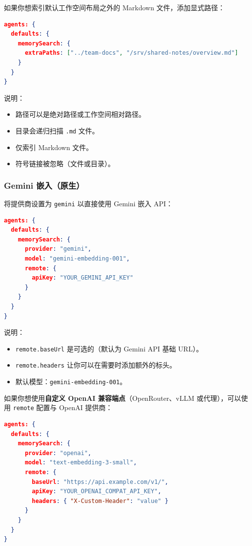 如果你想索引默认工作空间布局之外的 Markdown 文件，添加显式路径：

\begin{lstlisting}[language=json]
agents: {
  defaults: {
    memorySearch: {
      extraPaths: ["../team-docs", "/srv/shared-notes/overview.md"]
    }
  }
}
\end{lstlisting}


说明：

\begin{itemize}
  \item 路径可以是绝对路径或工作空间相对路径。
  \item 目录会递归扫描 \texttt{.md} 文件。
  \item 仅索引 Markdown 文件。
  \item 符号链接被忽略（文件或目录）。
\end{itemize}


\subsubsection{Gemini 嵌入（原生）}


将提供商设置为 \texttt{gemini} 以直接使用 Gemini 嵌入 API：

\begin{lstlisting}[language=json]
agents: {
  defaults: {
    memorySearch: {
      provider: "gemini",
      model: "gemini-embedding-001",
      remote: {
        apiKey: "YOUR_GEMINI_API_KEY"
      }
    }
  }
}
\end{lstlisting}


说明：

\begin{itemize}
  \item \texttt{remote.baseUrl} 是可选的（默认为 Gemini API 基础 URL）。
  \item \texttt{remote.headers} 让你可以在需要时添加额外的标头。
  \item 默认模型：\texttt{gemini-embedding-001}。
\end{itemize}


如果你想使用\textbf{自定义 OpenAI 兼容端点}（OpenRouter、vLLM 或代理），可以使用 \texttt{remote} 配置与 OpenAI 提供商：

\begin{lstlisting}[language=json]
agents: {
  defaults: {
    memorySearch: {
      provider: "openai",
      model: "text-embedding-3-small",
      remote: {
        baseUrl: "https://api.example.com/v1/",
        apiKey: "YOUR_OPENAI_COMPAT_API_KEY",
        headers: { "X-Custom-Header": "value" }
      }
    }
  }
}
\end{lstlisting}


